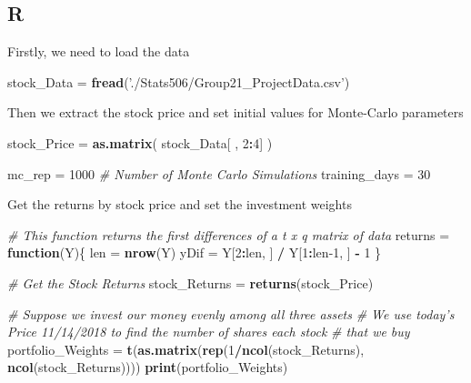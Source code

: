 \documentclass[]{book}
\newenvironment{Shaded}{\begin{snugshade}}{\end{snugshade}}
\newcommand{\CommentTok}[1]{\textcolor[rgb]{0.56,0.35,0.01}{\textit{#1}}}
\newcommand{\ControlFlowTok}[1]{\textcolor[rgb]{0.13,0.29,0.53}{\textbf{#1}}}
\newcommand{\DecValTok}[1]{\textcolor[rgb]{0.00,0.00,0.81}{#1}}
\newcommand{\KeywordTok}[1]{\textcolor[rgb]{0.13,0.29,0.53}{\textbf{#1}}}
\newcommand{\NormalTok}[1]{#1}
\newcommand{\OperatorTok}[1]{\textcolor[rgb]{0.81,0.36,0.00}{\textbf{#1}}}
\newcommand{\StringTok}[1]{\textcolor[rgb]{0.31,0.60,0.02}{#1}}
\begin{document}
\hypertarget{r}{%
\subsection{R}\label{r}}

Firstly, we need to load the data

\begin{Shaded}
\begin{Highlighting}[]
\NormalTok{stock_Data =}\StringTok{ }\KeywordTok{fread}\NormalTok{(}\StringTok{'./Stats506/Group21_ProjectData.csv'}\NormalTok{)}
\end{Highlighting}
\end{Shaded}

Then we extract the stock price and set initial values for Monte-Carlo parameters

\begin{Shaded}
\begin{Highlighting}[]
\NormalTok{stock_Price =}\StringTok{ }\KeywordTok{as.matrix}\NormalTok{( stock_Data[ , }\DecValTok{2}\OperatorTok{:}\DecValTok{4}\NormalTok{] )}

\NormalTok{mc_rep =}\StringTok{ }\DecValTok{1000} \CommentTok{# Number of Monte Carlo Simulations}
\NormalTok{training_days =}\StringTok{ }\DecValTok{30} 
\end{Highlighting}
\end{Shaded}

Get the returns by stock price and set the investment weights

\begin{Shaded}
\begin{Highlighting}[]
\CommentTok{# This function returns the first differences of a t x q matrix of data}
\NormalTok{returns =}\StringTok{ }\ControlFlowTok{function}\NormalTok{(Y)\{}
\NormalTok{  len =}\StringTok{ }\KeywordTok{nrow}\NormalTok{(Y)}
\NormalTok{  yDif =}\StringTok{ }\NormalTok{Y[}\DecValTok{2}\OperatorTok{:}\NormalTok{len, ] }\OperatorTok{/}\StringTok{ }\NormalTok{Y[}\DecValTok{1}\OperatorTok{:}\NormalTok{len}\DecValTok{-1}\NormalTok{, ] }\OperatorTok{-}\StringTok{ }\DecValTok{1}
\NormalTok{\}}

\CommentTok{# Get the Stock Returns}
\NormalTok{stock_Returns =}\StringTok{ }\KeywordTok{returns}\NormalTok{(stock_Price)}

\CommentTok{# Suppose we invest our money evenly among all three assets }
\CommentTok{# We use today's Price 11/14/2018 to find the number of shares each stock }
\CommentTok{# that we buy}
\NormalTok{portfolio_Weights =}\StringTok{ }\KeywordTok{t}\NormalTok{(}\KeywordTok{as.matrix}\NormalTok{(}\KeywordTok{rep}\NormalTok{(}\DecValTok{1}\OperatorTok{/}\KeywordTok{ncol}\NormalTok{(stock_Returns), }\KeywordTok{ncol}\NormalTok{(stock_Returns))))}
\KeywordTok{print}\NormalTok{(portfolio_Weights)}
\end{Highlighting}
\end{Shaded}
\end{document}

